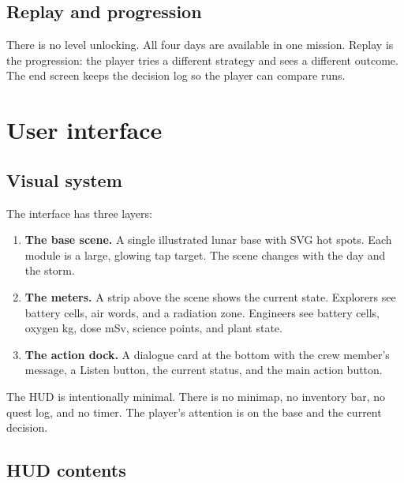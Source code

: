 \documentclass[11pt,a4paper]{article}
\begin{document}
\subsection{Replay and progression}

There is no level unlocking. All four days are available in one mission. Replay is the progression: the player tries a different strategy and sees a different outcome. The end screen keeps the decision log so the player can compare runs.

\section{User interface}

\subsection{Visual system}

The interface has three layers:

\begin{enumerate}
  \item \textbf{The base scene.} A single illustrated lunar base with SVG hot spots. Each module is a large, glowing tap target. The scene changes with the day and the storm.
  \item \textbf{The meters.} A strip above the scene shows the current state. Explorers see battery cells, air words, and a radiation zone. Engineers see battery cells, oxygen kg, dose mSv, science points, and plant state.
  \item \textbf{The action dock.} A dialogue card at the bottom with the crew member's message, a Listen button, the current status, and the main action button.
\end{enumerate}

The HUD is intentionally minimal. There is no minimap, no inventory bar, no quest log, and no timer. The player's attention is on the base and the current decision.

\subsection{HUD contents}
\end{document}
